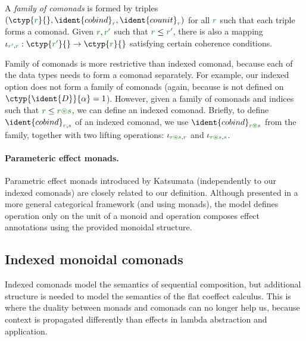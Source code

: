 \begin{definition}
\label{def:flat-family}
A \emph{family of comonads} is formed by triples $(\ctyp{\cclrd{r}}{}, \ident{cobind}_{\cclrd{r}}, 
  \ident{counit}_{\cclrd{r}})$ for all $\cclrd{r}$ such that each triple forms a comonad. Given 
$\cclrd{r}, \cclrd{r'}$ such that $\cclrd{r} \leq \cclrd{r'}$, there is also a mapping 
$\iota_{\cclrd{r'}, \cclrd{r}} : \ctyp{\cclrd{r'}}{} \rightarrow \ctyp{\cclrd{r}}{}$ satisfying
certain coherence conditions.
\end{definition}

Family of comonads is more restrictive than indexed comonad, because each of the data types needs
to form a comonad separately. For example, our indexed option does not form a family of comonads
(again, because  is not defined on $\ctyp{\ident{D}}{\alpha}=1$). However, given a 
family of comonads and indices such that $\cclrd{r} \leq \cclrd{r}\cseq\cclrd{s}$, we can define 
an indexed comonad. Briefly, to define $\ident{cobind}_{\cclrd{r},\cclrd{s}}$ of an indexed comonad, 
we use $\ident{cobind}_{\cclrd{r}\cseq\cclrd{s}}$ from the family, together with two lifting operations:
$\iota_{\cclrd{r}\cseq\cclrd{s}, \cclrd{r}}$ and $\iota_{\cclrd{r}\cseq\cclrd{s}, \cclrd{s}}$.

\paragraph{Parameteric effect monads.}
Parametric effect monads introduced by Katsumata \cite{monads-parametric} (independently to our 
indexed comonads) are closely related to our definition.  Although presented in a more general 
categorical framework (and using monads), the model defines  operation only on the 
unit of a monoid and  operation composes effect annotations using the provided monoidal 
structure.



\subsection{Indexed monoidal comonads}
\label{sec:flat-semantics-monoidal}

Indexed comonads model the semantics of sequential composition, but additional structure is needed
to model the semantics of the flat coeffect calculus. This is where the duality between monads and 
comonads can no longer help us, because context is propagated differently than effects in lambda 
abstraction and application.

